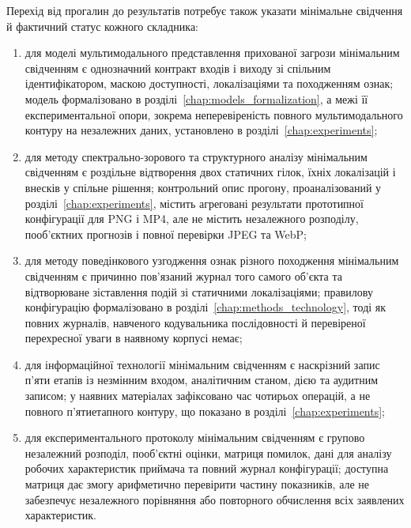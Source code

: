 Перехід від прогалин до результатів потребує також указати мінімальне свідчення й фактичний статус кожного складника:

\begin{enumerate}[label=\arabic*)]
\item для моделі мультимодального представлення прихованої загрози мінімальним свідченням є однозначний контракт входів і виходу зі спільним ідентифікатором, маскою доступності, локалізаціями та походженням ознак; модель формалізовано в розділі~\ref{chap:models_formalization}, а межі її експериментальної опори, зокрема неперевіреність повного мультимодального контуру на незалежних даних, установлено в розділі~\ref{chap:experiments};

\item для методу спектрально-зорового та структурного аналізу мінімальним свідченням є роздільне відтворення двох статичних гілок, їхніх локалізацій і внесків у спільне рішення; контрольний опис прогону, проаналізований у розділі~\ref{chap:experiments}, містить агреговані результати прототипної конфігурації для PNG і MP4, але не містить незалежного розподілу, пооб’єктних прогнозів і повної перевірки JPEG та WebP;

\item для методу поведінкового узгодження ознак різного походження мінімальним свідченням є причинно пов’язаний журнал того самого об’єкта та відтворюване зіставлення подій зі статичними локалізаціями; правилову конфігурацію формалізовано в розділі~\ref{chap:methods_technology}, тоді як повних журналів, навченого кодувальника послідовності й перевіреної перехресної уваги в наявному корпусі немає;

\item для інформаційної технології мінімальним свідченням є наскрізний запис п’яти етапів із незмінним входом, аналітичним станом, дією та аудитним записом; у наявних матеріалах зафіксовано час чотирьох операцій, а не повного п’ятиетапного контуру, що показано в розділі~\ref{chap:experiments};

\item для експериментального протоколу мінімальним свідченням є групово незалежний розподіл, пооб’єктні оцінки, матриця помилок, дані для аналізу робочих характеристик приймача та повний журнал конфігурації; доступна матриця дає змогу арифметично перевірити частину показників, але не забезпечує незалежного порівняння або повторного обчислення всіх заявлених характеристик.
\end{enumerate}

